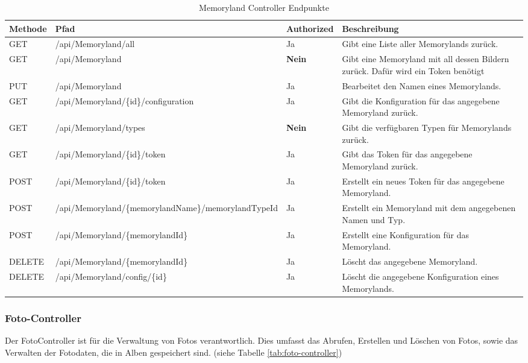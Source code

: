 \begin{table}[h t]
    \centering
    \caption{Memoryland Controller Endpunkte}
    \label{tab:memoryland-controller}
    \begin{tabular}{|l|p{5cm}|l|p{5cm}|}
    \hline
    \textbf{Methode} & \textbf{Pfad} & \textbf{Authorized} & \textbf{Beschreibung} \\ \hline
    GET & /api/Memoryland/all & Ja & Gibt eine Liste aller Memorylands zurück. \\ \hline
    GET & /api/Memoryland & \textbf{Nein} & Gibt eine Memoryland mit all dessen Bildern zurück. Dafür wird ein Token benötigt \\ \hline
    PUT & /api/Memoryland & Ja & Bearbeitet den Namen eines Memorylands. \\ \hline
    GET & /api/Memoryland/\{id\}\break/configuration & Ja & Gibt die Konfiguration für das angegebene Memoryland zurück. \\ \hline
    GET & /api/Memoryland/types & \textbf{Nein} & Gibt die verfügbaren Typen für Memorylands zurück. \\ \hline
    GET & /api/Memoryland/\{id\}\break/token & Ja & Gibt das Token für das angegebene Memoryland zurück. \\ \hline
    POST & /api/Memoryland/\{id\}\break/token & Ja & Erstellt ein neues Token für das angegebene Memoryland. \\ \hline
    POST & /api/Memoryland\break/\{memorylandName\}\break/{memorylandTypeId} & Ja & Erstellt ein Memoryland mit dem angegebenen Namen und Typ. \\ \hline
    POST & /api/Memoryland\break/\{memorylandId\} & Ja & Erstellt eine Konfiguration für das Memoryland. \\ \hline
    DELETE & /api/Memoryland\break/\{memorylandId\} & Ja & Löscht das angegebene Memoryland. \\ \hline
    DELETE & /api/Memoryland/config\break/\{id\} & Ja & Löscht die angegebene Konfiguration eines Memorylands. \\ \hline
    \end{tabular}
\end{table}


\subsubsection{Foto-Controller}

Der FotoController ist für die Verwaltung von Fotos verantwortlich. Dies umfasst das 
Abrufen, Erstellen und Löschen von Fotos, sowie das Verwalten der Fotodaten, die in 
Alben gespeichert sind. (siehe Tabelle \ref{tab:foto-controller})

